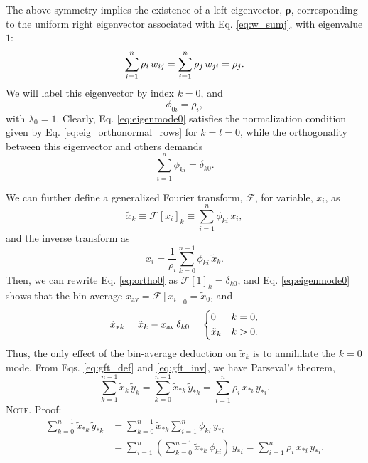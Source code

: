 \documentclass[preprint, superscriptaddress, floatfix]{revtex4-1}
\newcommand{\note}[1]{{\color{DarkGreen}\footnotesize \textsc{Note.} #1}}
\newcommand{\bav}[1]{#1_\mathrm{av}}
\begin{document}
The above symmetry implies the existence of
a left eigenvector, $\pmb \rho$,
corresponding to the uniform right eigenvector
associated with Eq. \eqref{eq:w_sumj},
with eigenvalue $1$:
%
\begin{equation}
  \sum_{i = 1}^n \rho_i \, w_{ij}
  =
  \sum_{i = 1}^n \rho_j \, w_{ji}
  =
  \rho_j
  .
  \notag
\end{equation}
%
We will label this eigenvector by index $k = 0$,
and
%
\begin{equation}
  \phi_{0i} = \rho_i,
\label{eq:eigenmode0}
\end{equation}
%
with $\lambda_0 = 1$.
%
Clearly, Eq. \eqref{eq:eigenmode0}
satisfies the normalization condition
given by Eq. \eqref{eq:eig_orthonormal_rows}
for $k = l = 0$,
while the orthogonality between this eigenvector and others demands
%
\begin{equation}
  \sum_{ i = 1 }^n \phi_{ki}
  =
  \delta_{k0}
  .
\label{eq:ortho0}
\end{equation}

We can further define
a generalized Fourier transform, $\mathcal{F}$,
for variable, $x_i$, as
%
\begin{equation}
  {\tilde x}_k
  \equiv \mathcal{F}[x_i]_k
  \equiv \sum_{i = 1}^n \phi_{ki} \, x_i
  ,
  \label{eq:gft_def}
\end{equation}
%
and the inverse transform as
%
\begin{equation}
  x_i = \frac{1}{\rho_i} \sum_{k = 0}^{n-1} \phi_{ki} \, \tilde{x}_k
  .
  \label{eq:gft_inv}
\end{equation}
%
Then,
we can rewrite Eq. \eqref{eq:ortho0} as
$\mathcal F[1]_k = \delta_{k0}$,
%
and Eq. \eqref{eq:eigenmode0} shows that
the bin average
$\bav{x}= \mathcal F[x_i]_0 = \tilde x_0$,
%
and
\begin{equation}
  \tilde x_{*k}
  = \tilde x_k - \bav{x} \, \delta_{k0}
  =
  \begin{dcases}
    0           & k = 0
    ,
    \\
    \tilde x_k  & k > 0
    .
  \end{dcases}
  \label{eq:xtstar}
\end{equation}
%
Thus, the only effect
of the bin-average deduction on $\tilde x_k$ is to
annihilate the $k=0$ mode.
%
From Eqs. \eqref{eq:gft_def} and \eqref{eq:gft_inv},
we have Parseval's theorem,
\begin{equation}
  \sum_{k=1}^{n-1} \tilde x_k \, \tilde y_k
  =
  \sum_{k=0}^{n-1} \tilde x_{*k} \, \tilde y_{*k}
  =
  \sum_{i=1}^n \rho_i \, x_{*i} \, y_{*i}
  .
  \label{eq:parseval}
\end{equation}
\note{Proof:
\begin{align*}
  \sum_{k=0}^{n-1} \tilde x_{*k} \, \tilde y_{*k}
  &=
  \sum_{k=0}^{n-1} \tilde x_{*k} \sum_{i=1}^n \phi_{ki} \, y_{*i}
  \\
  &=
  \sum_{i=1}^n \left( \sum_{k=0}^{n-1} \tilde x_{*k} \, \phi_{ki} \right) \, y_{*i}
  =
  \sum_{i=1}^n \rho_i \, x_{*i} \, y_{*i}.
\end{align*}
}
\end{document}
